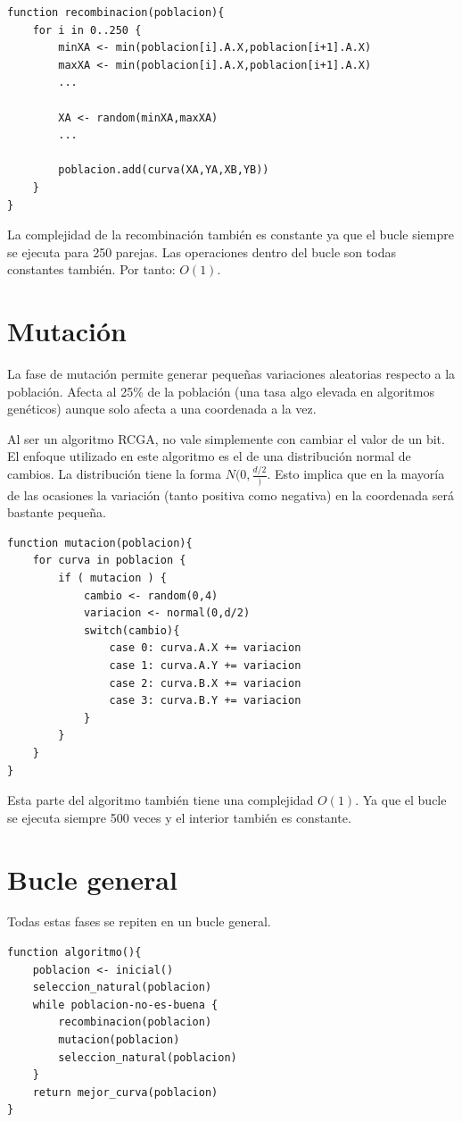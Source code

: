 \documentclass{report}
\begin{document}
\begin{lstlisting}
function recombinacion(poblacion){
	for i in 0..250 {
		minXA <- min(poblacion[i].A.X,poblacion[i+1].A.X)
		maxXA <- min(poblacion[i].A.X,poblacion[i+1].A.X)
		...

		XA <- random(minXA,maxXA)
		...

		poblacion.add(curva(XA,YA,XB,YB))
	}
}
\end{lstlisting}

La complejidad de la recombinación también es constante ya que el bucle siempre se ejecuta para 250 parejas. Las operaciones dentro del bucle son
todas constantes también. Por tanto: $ O(1) $.

\section{Mutación}

La fase de mutación permite generar pequeñas variaciones aleatorias respecto a la población. Afecta al 25\% de la población (una tasa algo elevada en algoritmos genéticos) aunque solo afecta a una coordenada a la vez. 

Al ser un algoritmo RCGA, no vale simplemente con cambiar el valor de un bit. El enfoque utilizado en este algoritmo es el de una distribución normal de cambios. La distribución tiene la forma $ N(0,\frac{d/2}) $. Esto implica que en la mayoría de las ocasiones la variación (tanto positiva como negativa) en la coordenada será bastante pequeña.

\begin{lstlisting}
function mutacion(poblacion){
	for curva in poblacion {
		if ( mutacion ) {
			cambio <- random(0,4)
			variacion <- normal(0,d/2)
			switch(cambio){
				case 0: curva.A.X += variacion
				case 1: curva.A.Y += variacion
				case 2: curva.B.X += variacion
				case 3: curva.B.Y += variacion
			}
		}
	}
}
\end{lstlisting}

Esta parte del algoritmo también tiene una complejidad $ O(1) $. Ya que el bucle se ejecuta siempre 500 veces y el interior también es constante.

\section{Bucle general}

Todas estas fases se repiten en un bucle general.

\begin{lstlisting}
function algoritmo(){
	poblacion <- inicial()
	seleccion_natural(poblacion)
	while poblacion-no-es-buena {
		recombinacion(poblacion)
		mutacion(poblacion)
		seleccion_natural(poblacion)
	}
	return mejor_curva(poblacion)
}
\end{lstlisting}
\end{document}
